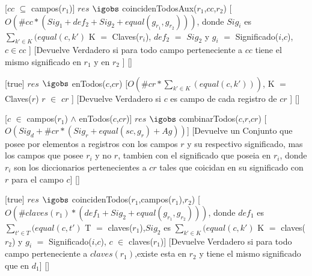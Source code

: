 \begin{Interfaz}
  [$cc$ $\subseteq$ campos($r_1$)] %
  {$res$ $\igobs$ coincidenTodosAux($r_1$,$cc$,$r_2$)} %
  [$O(\#cc*(Sig_1 + def_2 + Sig_2 + equal(g_{r_1},g_{r_2})))$, donde $Sig_i$ es $\sum_{k' \in K}(equal(c,k')$ K $=$ Claves($r_i$), $def_2$ $=$ $Sig_2$ y $g_i$ $=$ Significado($i$,$c$), $c \in cc$ ] %
  [Devuelve Verdadero si para todo campo perteneciente a $cc$ tiene el mismo significado en $r_1$ y en $r_2$ ] %
  [] %

  [true] %
  {$res$ $\igobs$ enTodos($c$,$cr$)} %
  [$O(\#cr*\sum_{k' \in K}(equal(c,k')))$, K $=$ Claves($r$) $r$ $\in$ $cr$ ] %
  [Devuelve Verdadero si $c$ es campo de cada registro de $cr$ ] %
  [] %

  [$c$ $\in$ campos($r_1$) $\land$ enTodos($c$,$cr$)] %
  {$res$ $\igobs$ combinarTodos($c$,$r$,$cr$)} %
  [$O(Sig_d + \#cr*(Sig_r + equal(sc,g_{r}) + Ag))$] %
  [Devuelve un Conjunto que posee por elementos a registros con los campos $r$ y su respectivo significado, mas los campos que posee $r_i$ y no $r$, tambien con el significado que poseia en $r_i$, donde $r_i$ son los diccionarios pertenecientes a $cr$ tales que coicidan en su significado con $r$ para el campo $c$] %
  [] %

  [true] %
  {$res$ $\igobs$ coincidenTodos($r_1$,campos($r_1$),$r_2$)} %
  [$O(\#claves(r_1)*(def_1 + Sig_2 + equal(g_{r_1},g_{r_2})))$, donde $def_1$ es $\sum_{t' \in T}(equal(c,t')$ T $=$ claves($r_1$),$Sig_2$ es $\sum_{k' \in K}(equal(c,k')$ K $=$ claves($r_2$) y $g_i$ $=$ Significado($i$,$c$), $c$ $\in$ claves($r_1$)] %
  [Devuelve Verdadero si para todo campo perteneciente a $claves(r_1)$,existe esta en $r_2$  y tiene el mismo significado que en $d_1$] %
  [] %

\end{Interfaz}

